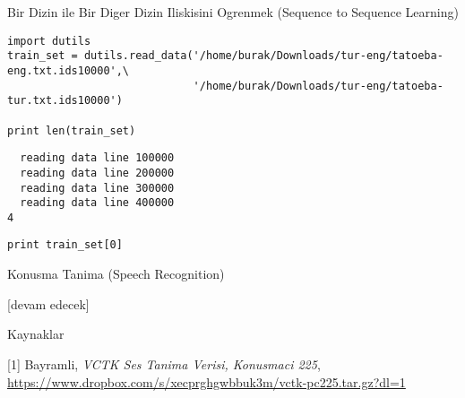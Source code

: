 \documentclass[12pt,fleqn]{article}\usepackage{../../common}
\begin{document}
Bir Dizin ile Bir Diger Dizin Iliskisini Ogrenmek (Sequence to Sequence Learning)

\begin{verbatim}
import dutils
train_set = dutils.read_data('/home/burak/Downloads/tur-eng/tatoeba-eng.txt.ids10000',\
                             '/home/burak/Downloads/tur-eng/tatoeba-tur.txt.ids10000')

print len(train_set)
\end{verbatim}

\begin{verbatim}
  reading data line 100000
  reading data line 200000
  reading data line 300000
  reading data line 400000
4
\end{verbatim}

\begin{verbatim}
print train_set[0]
\end{verbatim}













Konusma Tanima (Speech Recognition)












[devam edecek]

Kaynaklar

[1] Bayramli, {\em VCTK Ses Tanima Verisi, Konusmaci 225}, \url{https://www.dropbox.com/s/xecprghgwbbuk3m/vctk-pc225.tar.gz?dl=1}
\end{document}
